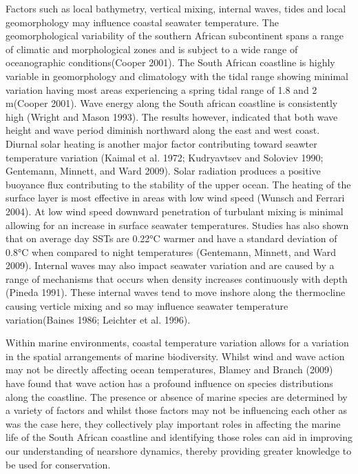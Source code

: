 \documentclass[12pt,a4paper,]{article}
\begin{document}
Factors such as local bathymetry, vertical mixing, internal waves, tides
and local geomorphology may influence coastal seawater temperature. The
geomorphological variability of the southern African subcontinent spans
a range of climatic and morphological zones and is subject to a wide
range of oceanographic conditions(Cooper 2001). The South African
coastline is highly variable in geomorphology and climatology with the
tidal range showing minimal variation having most areas experiencing a
spring tidal range of 1.8 and 2 m(Cooper 2001). Wave energy along the
South african coastline is consistently high (Wright and Mason 1993).
The results however, indicated that both wave height and wave period
diminish northward along the east and west coast. Diurnal solar heating
is another major factor contributing toward seawter temperature
variation (Kaimal et al. 1972; Kudryavtsev and Soloviev 1990; Gentemann,
Minnett, and Ward 2009). Solar radiation produces a positive buoyance
flux contributing to the stability of the upper ocean. The heating of
the surface layer is most effective in areas with low wind speed (Wunsch
and Ferrari 2004). At low wind speed downward penetration of turbulant
mixing is minimal allowing for an increase in surface seawater
temperatures. Studies has also shown that on average day SSTs are 0.22°C
warmer and have a standard deviation of 0.8°C when compared to night
temperatures (Gentemann, Minnett, and Ward 2009). Internal waves may
also impact seawater variation and are caused by a range of mechanisms
that occurs when density increases continuously with depth (Pineda
1991). These internal waves tend to move inshore along the thermocline
causing verticle mixing and so may influence seawater temperature
variation(Baines 1986; Leichter et al. 1996).

Within marine environments, coastal temperature variation allows for a
variation in the spatial arrangements of marine biodiversity. Whilst
wind and wave action may not be directly affecting ocean temperatures,
Blamey and Branch (2009) have found that wave action has a profound
influence on species distributions along the coastline. The presence or
absence of marine species are determined by a variety of factors and
whilst those factors may not be influencing each other as was the case
here, they collectively play important roles in affecting the marine
life of the South African coastline and identifying those roles can aid
in improving our understanding of nearshore dynamics, thereby providing
greater knowledge to be used for conservation.
\end{document}
